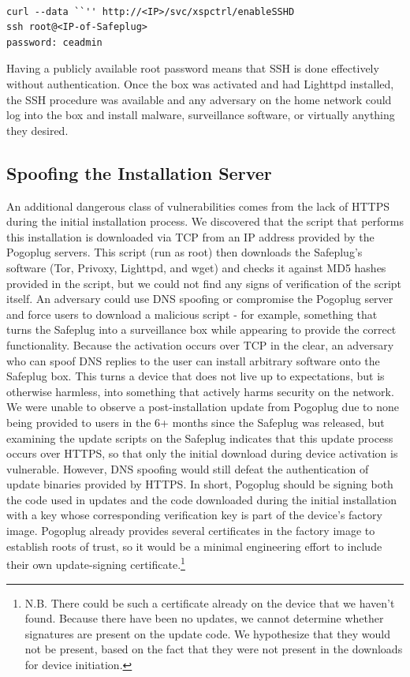 \documentclass[letterpaper,twocolumn,10pt]{article}
\begin{document}
{\tt \small
\begin{verbatim}
curl --data ``'' http://<IP>/svc/xspctrl/enableSSHD
ssh root@<IP-of-Safeplug>
password: ceadmin
\end{verbatim}
}

Having a publicly available root password means that SSH is done effectively without authentication.  Once the box was activated and had Lighttpd installed, the SSH procedure was available and any adversary on the home network could log into the box and install malware, surveillance software, or virtually anything they desired.

\subsection{Spoofing the Installation Server}
\label{dnsspoof}
An additional dangerous class of vulnerabilities comes from the lack of HTTPS during the initial installation process.  We discovered that the script that performs this installation is downloaded via TCP from an IP address provided by the Pogoplug servers.  This script (run as root) then downloads the Safeplug's software (Tor, Privoxy, Lighttpd, and wget) and checks it against MD5 hashes provided in the script, but we could not find any signs of verification of the script itself.  An adversary could use DNS spoofing or compromise the Pogoplug server and force users to download a malicious script - for example, something that turns the Safeplug into a surveillance box while appearing to provide the correct functionality.  Because the activation occurs over TCP in the clear, an adversary who can spoof DNS replies to the user can install arbitrary software onto the Safeplug box.  This turns a device that does not live up to expectations, but is otherwise harmless, into something that actively harms security on the network.  We were unable to observe a post-installation update from Pogoplug due to none being provided to users in the 6+ months since the Safeplug was released, but examining the update scripts on the Safeplug indicates that this update process occurs over HTTPS, so that only the initial download during device activation is vulnerable. However, DNS spoofing would still defeat the authentication of update binaries provided by HTTPS. In short, Pogoplug should be signing both the code used in updates and the code downloaded during the initial installation with a key whose corresponding verification key is part of the device's factory image. Pogoplug already provides several certificates in the factory image to establish roots of trust, so it would be a minimal engineering effort to include their own update-signing certificate.\footnote{N.B. There could be such a certificate already on the device that we haven't found. Because there have been no updates, we cannot determine whether signatures are present on the update code. We hypothesize that they would not be present, based on the fact that they were not present in the downloads for device initiation.}
\end{document}

